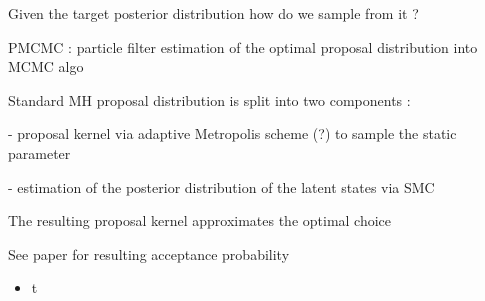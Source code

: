 \documentclass[10pt,a4paper]{article}
\begin{document}
Given the target posterior distribution how do we sample from it ?

PMCMC : particle filter estimation of the optimal proposal distribution into MCMC algo

Standard MH proposal distribution is split into two components :

- proposal kernel via adaptive Metropolis scheme (?) to sample the static parameter

- estimation of the posterior distribution of the latent states via SMC

The resulting proposal kernel approximates the optimal choice

See paper for resulting acceptance probability

\begin{itemize}
\item t
\end{itemize}
\end{document}

